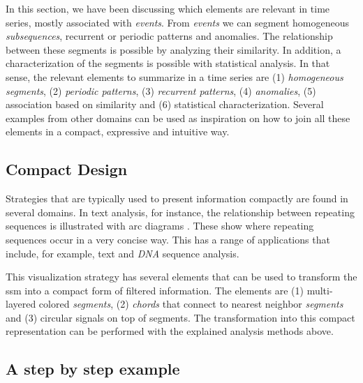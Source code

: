 {In this section, we have been discussing which elements are relevant in time series, mostly associated with \textit{events}. From \textit{events} we can segment homogeneous \textit{subsequences}, recurrent or periodic patterns and anomalies. The relationship between these segments is possible by analyzing their similarity. In addition, a characterization of the segments is possible with statistical analysis. In that sense, the relevant elements to summarize in a time series are (1) \textit{homogeneous segments}, (2) \textit{periodic patterns}, (3) \textit{recurrent patterns}, (4) \textit{anomalies}, (5) association based on similarity and (6) statistical characterization. Several examples from other domains can be used as inspiration on how to join all these elements in a compact, expressive and intuitive way.

\subsection{Compact Design}

Strategies that are typically used to present information compactly are found in several domains. In text analysis, for instance, the relationship between repeating sequences is illustrated with arc diagrams \cite{bitmap, arcplots}. These show where repeating sequences occur in a very concise way. This has a range of applications that include, for example, text and \textit{DNA} sequence analysis.


\par
This visualization strategy has several elements that can be used to transform the \gls{ssm} into a compact form of filtered information. The elements are (1) multi-layered colored \textit{segments}, (2) \textit{chords} that connect to nearest neighbor \textit{segments} and (3) circular signals on top of segments. The transformation into this compact representation can be performed with the explained analysis methods above.

\subsection{A step by step example}

}
